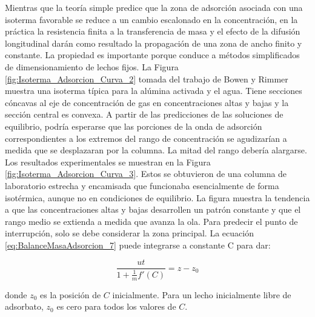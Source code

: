 \documentclass[11pt]{book}
\begin{document}
Mientras que la teoría simple predice que la zona de adsorción asociada con una isoterma favorable se reduce a un cambio escalonado en la concentración, en la práctica la resistencia finita a la transferencia de masa y el efecto de la difusión longitudinal darán como resultado la propagación de una zona de ancho finito y constante. La propiedad es importante porque conduce a métodos simplificados de dimensionamiento de lechos fijos. La Figura \ref{fig:Isoterma_Adsorcion_Curva_2} tomada del trabajo de Bowen y Rimmer muestra una isoterma típica para la alúmina activada y el agua. Tiene secciones cóncavas al eje de concentración de gas en concentraciones altas y bajas y la sección central es convexa. A partir de las predicciones de las soluciones de equilibrio, podría esperarse que las porciones de la onda de adsorción correspondientes a los extremos del rango de concentración se agudizarían a medida que se desplazaran por la columna. La mitad del rango debería alargarse. Los resultados experimentales se muestran en la Figura \ref{fig:Isoterma_Adsorcion_Curva_3}. Estos se obtuvieron de una columna de laboratorio estrecha y encamisada que funcionaba esencialmente de forma isotérmica, aunque no en condiciones de equilibrio. La figura muestra la tendencia a que las concentraciones altas y bajas desarrollen un patrón constante y que el rango medio se extienda a medida que avanza la ola. Para predecir el punto de interrupción, solo se debe considerar la zona principal. La ecuación \ref{eq:BalanceMasaAdsorcion_7} puede integrarse a constante C para dar:

\begin{equation}
    \label{eq:BalanceMasaAdsorcion_8}
    \frac{u t}{1 + \frac{1}{m} f'(C)} = z -z_0
\end{equation}

donde $z_0$ es la posición de $C$ inicialmente. Para un lecho inicialmente libre de adsorbato, $z_0$ es cero para todos los valores de $C$.
\end{document}
